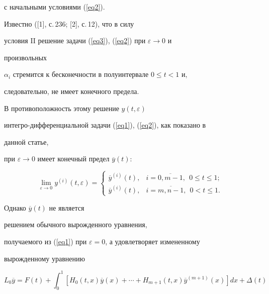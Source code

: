 с начальными условиями (\ref{eq2}).


Известно ([1], с.\,236; [2], с.\,12), что в силу 


условия II решение задачи (\ref{eq3}), (\ref{eq2}) при $\varepsilon \to 0$ и 


произвольных 


$\alpha _{i}$ стремится к бесконечности в полуинтервале $0 \le t < 1$ и, 


следовательно, не имеет конечного предела.





В противоположность этому решение $y(t,\varepsilon )$ 


интегро-дифференциальной задачи (\ref{eq1}), (\ref{eq2}), как показано в 


данной статье, 


при $\varepsilon \to 0$ имеет конечный предел $\overline {y}(t)$:


\begin{equation}


\label{eq4}


\lim\limits_{\varepsilon \to 0}y^{(i)}(t,\varepsilon ) = 


\begin{cases}


\overline{y}^{(i)}(t), & i=\overline{0,m-1},\ \ 0\le t\le 1;\\ 


\overline{y}^{(i)}(t), & i=\overline{m,n-1},\ \ 0<t \le 1.


\end{cases} 


\end{equation}


Однако $\overline {y}(t)$ не является 


решением обычного вырожденного уравнения, 


получаемого из (\ref{eq1}) при $\varepsilon = 0$, а удовлетворяет измененному 


вырожденному уравнению


\begin{equation}


\label{eq5}


L_{0} \overline {y} = F(t) +\int_{0}^{1}[H_{0} (t,x)\overline {y}(x) + 


\dotsb + H_{m + 1} (t,x)\overline {y}^{(m + 1)}(x)]dx + \Delta (t)


\end{equation}


